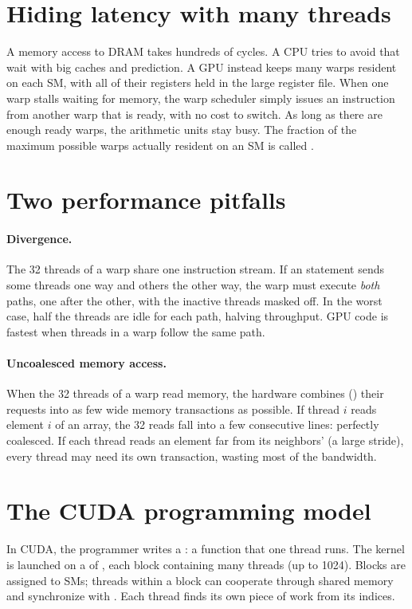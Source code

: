 \section{Hiding latency with many threads}

A memory access to DRAM takes hundreds of cycles. A CPU tries to avoid that wait with big caches and prediction. A GPU instead keeps many warps resident on each SM, with all of their registers held in the large register file. When one warp stalls waiting for memory, the warp scheduler simply issues an instruction from another warp that is ready, with no cost to switch. As long as there are enough ready warps, the arithmetic units stay busy. The fraction of the maximum possible warps actually resident on an SM is called .

\section{Two performance pitfalls}

\paragraph{Divergence.} The 32 threads of a warp share one instruction stream. If an  statement sends some threads one way and others the other way, the warp must execute \emph{both} paths, one after the other, with the inactive threads masked off. In the worst case, half the threads are idle for each path, halving throughput. GPU code is fastest when threads in a warp follow the same path.

\paragraph{Uncoalesced memory access.} When the 32 threads of a warp read memory, the hardware combines () their requests into as few wide memory transactions as possible. If thread $i$ reads element $i$ of an array, the 32 reads fall into a few consecutive lines: perfectly coalesced. If each thread reads an element far from its neighbors' (a large stride), every thread may need its own transaction, wasting most of the bandwidth.

\section{The CUDA programming model}

In CUDA, the programmer writes a : a function that one thread runs. The kernel is launched on a  of , each block containing many threads (up to 1024). Blocks are assigned to SMs; threads within a block can cooperate through shared memory and synchronize with . Each thread finds its own piece of work from its indices.

